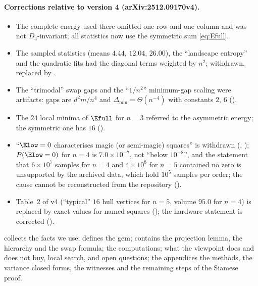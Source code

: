 \paragraph{Corrections relative to version 4 (arXiv:2512.09170v4).}
\begin{itemize}\setlength\itemsep{0pt}
\item[(a)] The complete energy used there omitted one row and one column and was not $D_4$-invariant; all statistics now use the symmetric sum \eqref{eq:Efull}.
\item[(b)] The sampled statistics (means $4.44$, $12.04$, $26.00$), the ``landscape entropy'' and the quadratic fits had the diagonal terms weighted by $n^2$; withdrawn, replaced by .
\item[(c)] The ``trimodal'' swap gaps and the ``$1/n^2$'' minimum-gap scaling were artifacts: gaps are $d^2m/n^4$ and $\Delta_{\min}=\Theta(n^{-4})$ with constants $2$, $6$ ().
\item[(d)] The $24$ local minima of $\Efull$ for $n=3$ referred to the asymmetric energy; the symmetric one has $16$ ().
\item[(e)] ``$\Elow=0$ characterises magic (or semi-magic) squares'' is withdrawn (, ); $P(\Elow=0)$ for $n=4$ is $7.0\times10^{-7}$, not ``below $10^{-8}$'', and the statement that $6\times10^7$ samples for $n=4$ and $4\times10^8$ for $n=5$ contained no zero is unsupported by the archived data, which hold $10^5$ samples per order; the cause cannot be reconstructed from the repository ().
\item[(f)] Table~2 of v4 (``typical'' $16$ hull vertices for $n=5$, volume $95.0$ for $n=4$) is replaced by exact values for named squares (); the hardware statement is corrected ().
\end{itemize}

 collects the facts we use;  defines the gem;  contains the projection lemma, the hierarchy and the swap formula;  the computations;  what the viewpoint does and does not buy, local search, and open questions; the appendices the methods, the variance closed forms, the witnesses and the remaining steps of the Siamese proof.
